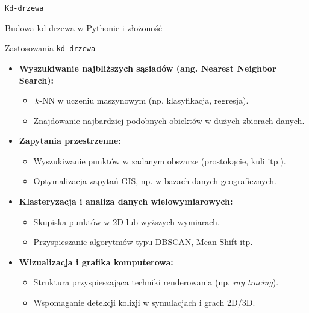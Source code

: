 \documentclass[aspectratio=1610, polish]{beamer}
\begin{document}
\begin{section}{\texttt{Kd-drzewa}}
\begin{frame}[fragile]{Budowa kd-drzewa w Pythonie i złożoność}
\end{frame}

\begin{frame}{Zastosowania \texttt{kd-drzewa}}
    \begin{itemize}
        \item \textbf{Wyszukiwanie najbliższych sąsiadów (ang. Nearest Neighbor Search):}
        \begin{itemize}
            \item \(\,k\)-NN w uczeniu maszynowym (np. klasyfikacja, regresja).
            \item Znajdowanie najbardziej podobnych obiektów w dużych zbiorach danych.
        \end{itemize}
        \vspace{-0.1em}
        
        \item \textbf{Zapytania przestrzenne:}
        \begin{itemize}
            \item Wyszukiwanie punktów w zadanym obszarze (prostokącie, kuli itp.).
            \item Optymalizacja zapytań GIS, np. w bazach danych geograficznych.
        \end{itemize}
        \vspace{-0.1em}
        
        \item \textbf{Klasteryzacja i analiza danych wielowymiarowych:}
        \begin{itemize}
            \item Skupiska punktów w 2D lub wyższych wymiarach.
            \item Przyspieszanie algorytmów typu DBSCAN, Mean Shift itp.
        \end{itemize}
        \vspace{-0.1em}
        
        \item \textbf{Wizualizacja i grafika komputerowa:}
        \begin{itemize}
            \item Struktura przyspieszająca techniki renderowania (np. \emph{ray tracing}).
            \item Wspomaganie detekcji kolizji w symulacjach i grach 2D/3D.
        \end{itemize}
        \vspace{-0.1em}
        

\end{itemize}
\end{frame}
\end{section}
\end{document}

